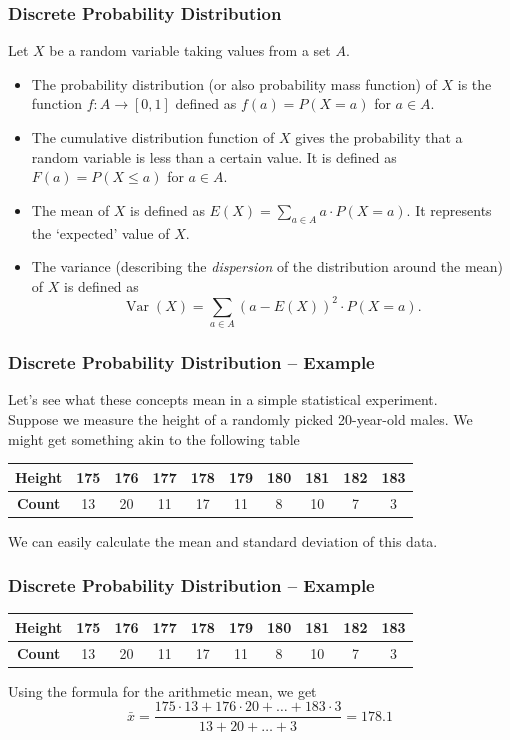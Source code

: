 \documentclass[aspectratio=169,11pt,usenames,dvipsnames,handout]{beamer}
\DeclareMathOperator{\var}{Var}
\begin{document}
\begin{frame}
 \subsectionpage
\end{frame}

\begin{frame}
 \frametitle{Discrete Probability Distribution}
 Let $X$ be a random variable taking values from a set $A$.\pause
 \begin{itemize}
  \item The \alert{probability distribution} (or also \alert{probability mass
   function}) of $X$ is the function $f:A \to [0,1]$ defined as $f(a) = P(X =
   a)$ for $a \in A$. \pause
  \item The \alert{cumulative distribution function} of $X$ gives the
   probability that a random variable is \alert{less than a certain value}. It
   is defined as $F(a) = P(X \leq a)$ for $a \in A$. \pause
  \item The \alert{mean} of $X$ is defined as $E(X) = \sum_{a \in A} a \cdot P(X = a)$.
   It represents the `expected' value of $X$. \pause
  \item The \alert{variance} (describing the \emph{dispersion} of the
   distribution around the mean) of $X$ is defined as
   \[
    \var(X) = \sum_{a \in A} (a - E(X))^2 \cdot P(X = a).
   \]
 \end{itemize}
\end{frame}

\begin{frame}
 \frametitle{Discrete Probability Distribution -- Example}
 Let's see what these concepts mean in a simple statistical experiment.\\ \pause
 Suppose we measure the height of a randomly picked 20-year-old males. We might
 get something akin to the following table
 \begin{center}
  \begin{tabular}{c|ccccccccc}
   \textbf{Height} & 175 & 176 & 177 & 178 & 179 & 180 & 181 & 182 & 183\\
   \midrule
   \textbf{Count} & 13 & 20 & 11 & 17 & 11 & 8 & 10 & 7 & 3
  \end{tabular}
 \end{center}
 \pause
 We can easily calculate the mean and standard deviation of this data. 
\end{frame}

\begin{frame}
 \frametitle{Discrete Probability Distribution -- Example}
  \begin{center}
  \begin{tabular}{c|ccccccccc}
   \textbf{Height} & 175 & 176 & 177 & 178 & 179 & 180 & 181 & 182 & 183\\
   \midrule
   \textbf{Count} & 13 & 20 & 11 & 17 & 11 & 8 & 10 & 7 & 3
  \end{tabular}
 \end{center}
 Using the formula for the arithmetic mean, we get
 \[
  \bar{x} = \frac{175 \cdot 13 + 176 \cdot 20 + \ldots + 183 \cdot 3}{13 + 20 +
  \ldots + 3} = 178.1
 \]
\end{frame}
\end{document}
